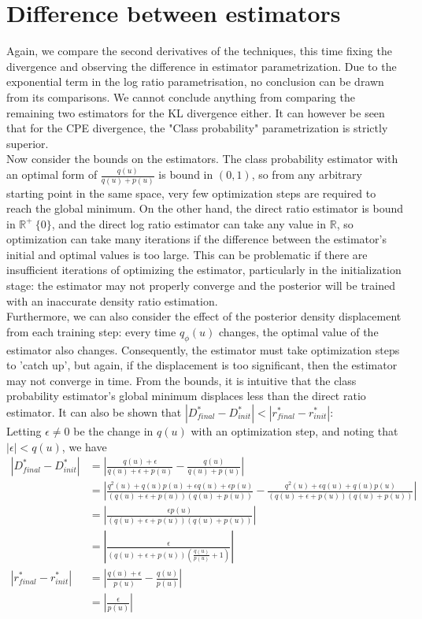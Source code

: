 \documentclass[honours,12pt]{unswthesis}
\newcommand{\R}{\mathbb{R}}
\numberwithin{equation}{section}
\theoremstyle{definition}
\begin{document}
\section{Difference between estimators}
Again, we compare the second derivatives of the techniques, this time fixing the divergence and observing the difference in estimator parametrization. Due to the exponential term in the log ratio parametrisation, no conclusion can be drawn from its comparisons. We cannot conclude anything from comparing the remaining two estimators for the KL divergence either. It can however be seen that for the CPE divergence, the "Class probability" parametrization is strictly superior.\\
Now consider the bounds on the estimators. The class probability estimator with an optimal form of $\frac{q(u)}{q(u)+p(u)}$ is bound in $(0,1)$, so from any arbitrary starting point in the same space, very few optimization steps are required to reach the global minimum. On the other hand, the direct ratio estimator is bound in $\R^+ \ \{0\}$, and the direct log ratio estimator can take any value in $\R$, so optimization can take many iterations if the difference between the estimator's initial and optimal values is too large. This can be problematic if there are insufficient iterations of optimizing the estimator, particularly in the initialization stage: the estimator may not properly converge and the posterior will be trained with an inaccurate density ratio estimation.\\
Furthermore, we can also consider the effect of the posterior density displacement from each training step: every time $q_\phi(u)$ changes, the optimal value of the estimator also changes. Consequently, the estimator must take optimization steps to 'catch up', but again, if the displacement is too significant, then the estimator may not converge in time. From the bounds, it is intuitive that the class probability estimator's global minimum displaces less than the direct ratio estimator. It can also be shown that $|D^*_{final}-D^*_{init}|<|r^*_{final}-r^*_{init}|$:\\
Letting $\epsilon\neq0$ be the change in $q(u)$ with an optimization step, and noting that $|\epsilon|<q(u)$, we have
\begin{align*}
|D^*_{final}-D^*_{init}|&=\left|\frac{q(u)+\epsilon}{q(u)+\epsilon+p(u)}-\frac{q(u)}{q(u)+p(u)}\right|\\
&=\left|\frac{q^2(u)+q(u)p(u)+\epsilon q(u)+\epsilon p(u)}{(q(u)+\epsilon+p(u))(q(u)+p(u))}-\frac{q^2(u)+\epsilon q(u)+q(u)p(u)}{(q(u)+\epsilon+p(u))(q(u)+p(u))}\right|\\
&=\left|\frac{\epsilon p(u)}{(q(u)+\epsilon+p(u))(q(u)+p(u))}\right|\\
&=\left|\frac{\epsilon}{(q(u)+\epsilon+p(u))(\frac{q(u)}{p(u)}+1)}\right|\\
|r^*_{final}-r^*_{init}|&=\left|\frac{q(u)+\epsilon}{p(u)}-\frac{q(u)}{p(u)}\right|\\
&=\left|\frac{\epsilon}{p(u)}\right|\\
\end{align*}
\end{document}
